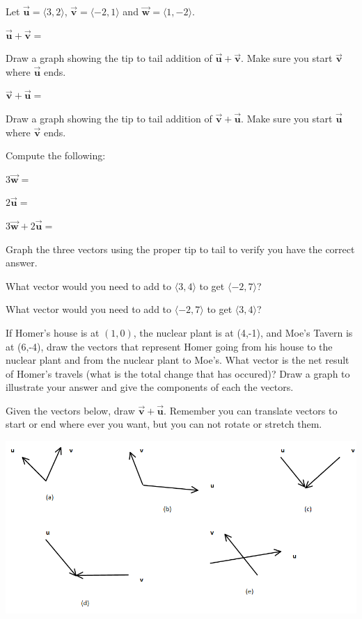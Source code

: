 \bq Let $\vec{\textbf{u}}=\langle 3,2 \rangle$, $\vec{\textbf{v}}=\langle -2,1 \rangle$ and $\vec{\textbf{w}}=\langle 1,-2\rangle$.
\be \item $\vec{\textbf{u}} + \vec{\textbf{v}}=$
\item Draw a graph showing the tip to tail addition of $\vec{\textbf{u}} + \vec{\textbf{v}}$. Make sure you start $\vec{\textbf{v}}$ where $\vec{\textbf{u}}$ ends.
\item $\vec{\textbf{v}} + \vec{\textbf{u}}=$
\item Draw a graph showing the tip to tail addition of $\vec{\textbf{v}} + \vec{\textbf{u}}$. Make sure you start $\vec{\textbf{u}}$ where $\vec{\textbf{v}}$ ends.
\item Compute the following:
\be
\item $3 \vec{\textbf{w}} =$
\item $2 \vec{\textbf{u}} =$
\item $3 \vec{\textbf{w}} + 2 \vec{\textbf{u}} =$
\ee
\item Graph the three vectors using the proper tip to tail to verify you have the correct answer.
\ee
\eq


\bq \be
\item What vector would you need to add to $\langle 3,4 \rangle$ to get \break $\langle -2,7 \rangle$?
\item What vector would you need to add to $\langle -2,7 \rangle$ to get $\langle 3,4 \rangle$?
\ee \eq

\bq If Homer's house is at $(1,0)$, the nuclear plant is at (4,-1), and Moe's Tavern is at (6,-4), draw the vectors that represent Homer going from his house to the nuclear plant and from the nuclear plant to Moe's. What vector is the net result of Homer's travels (what is the total change that has occured)? Draw a graph to illustrate your answer and give the components of each the vectors.
\eq

\bq Given the vectors below, draw $\vec{\textbf{v}}+\vec{\textbf{u}}$. Remember you can translate vectors to start or end where ever you want, but you can not rotate or stretch them.

\begin{center} \includegraphics[scale=.6]{vectorarray.png} \end{center}
\eq


